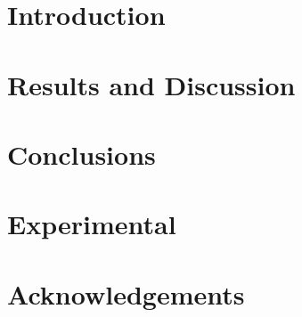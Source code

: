 \documentclass[articletitle=true]{rcclab}
\begin{document}
\section{Introduction}


\section{Results and Discussion}



\section{Conclusions}



\section{Experimental}


\section{Acknowledgements}



\clearpage
\printbibliography

\end{document}
